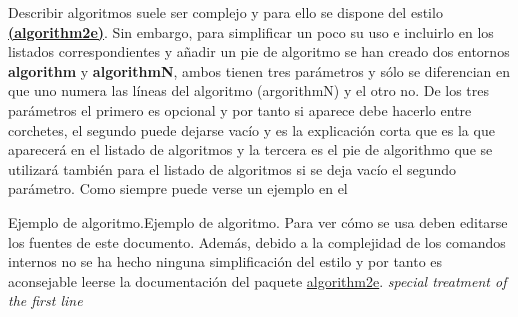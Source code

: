 Describir algoritmos suele ser complejo y para ello se dispone del estilo \textbf{\href{http://osl.ugr.es/CTAN/macros/latex/contrib/algorithm2e/doc/algorithm2e.pdf}{(algorithm2e)}}. Sin embargo, para simplificar un poco su uso e incluirlo en los listados correspondientes y añadir un pie de algoritmo se han creado dos entornos \textbf{algorithm} y \textbf{algorithmN}, ambos tienen tres parámetros y sólo se diferencian en que uno numera las líneas del algoritmo (argorithmN) y el otro no. De los tres parámetros el primero es opcional y por tanto si aparece debe hacerlo entre corchetes, el segundo puede dejarse vacío y es la explicación corta que es la que aparecerá en el listado de algoritmos y la tercera es el pie de algorithmo que se utilizará también para el listado de algoritmos si se deja vacío el segundo parámetro. Como siempre puede verse un ejemplo en el %

\begin{algorithmN}{Ejemplo de algoritmo.}{Ejemplo de algoritmo. Para ver cómo se usa deben editarse los fuentes de este documento. Además, debido a la complejidad de los comandos internos no se ha hecho ninguna simplificación del estilo y por tanto es aconsejable leerse la documentación del paquete \href{http://osl.ugr.es/CTAN/macros/latex/contrib/algorithm2e/doc/algorithm2e.pdf}{algorithm2e}.}
      \BlankLine
      \emph{special treatment of the first line}\;
\end{algorithmN}
